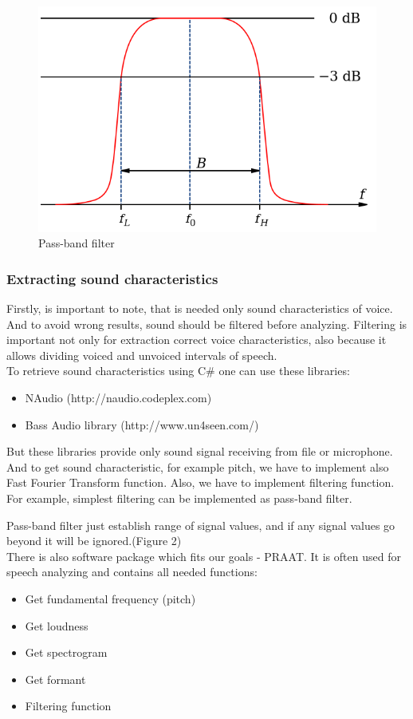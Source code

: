 \documentclass[14pt]{extarticle}
\begin{document}
\begin{figure}
	\centering
		\includegraphics[scale=0.7]{images/pass-band-filter.png}
	\caption{Pass-band filter}
	\label{fig:pass-band-filter}
\end{figure}

\subsubsection{Extracting sound characteristics}

Firstly, is important to note, that is needed only sound characteristics of voice. And to avoid wrong results, sound should be filtered before analyzing. Filtering is important not only for extraction correct voice characteristics, also because it allows dividing voiced and unvoiced intervals of speech.
\\

To retrieve sound characteristics using C\# one can use these libraries:
\begin{itemize}
	\item NAudio (http://naudio.codeplex.com)
	\item Bass Audio library (http://www.un4seen.com/)
\end{itemize}

But these libraries provide only sound signal receiving from file or microphone. And to get sound characteristic, for example pitch, we have to implement also Fast Fourier Transform function. Also, we have to implement filtering function. For example, simplest filtering can be implemented as pass-band filter. 

Pass-band filter just establish range of signal values, and if any signal values go beyond it will be ignored.(Figure 2)
\\
There is also software package which fits our goals - PRAAT\cite{praat}. It is often used for speech analyzing and contains all needed functions:
\begin{itemize}
	\item Get fundamental frequency (pitch)
	\item Get loudness
	\item Get spectrogram
	\item Get formant
	\item Filtering function
\end{itemize}
\end{document}
